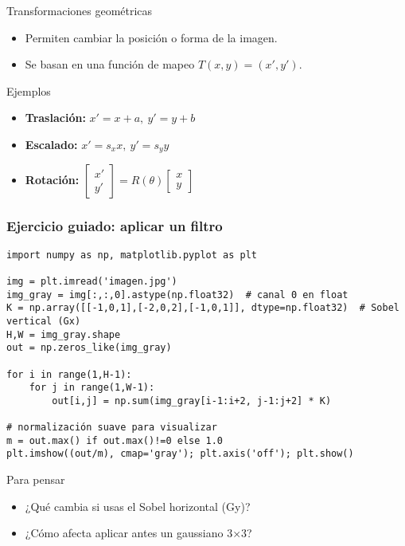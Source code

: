 \documentclass[10pt]{beamer}
\begin{document}
\begin{frame}{Transformaciones geom\'etricas}
\begin{itemize}
  \item Permiten cambiar la posici\'on o forma de la imagen.
  \item Se basan en una funci\'on de mapeo $T(x,y) = (x',y')$.
\end{itemize}
\vspace{3mm}
\begin{block}{Ejemplos}
\begin{itemize}
  \item \textbf{Traslaci\'on:} $x' = x + a,\ y' = y + b$
  \item \textbf{Escalado:} $x' = s_x x,\ y' = s_y y$
  \item \textbf{Rotaci\'on:} $\begin{bmatrix}x'\\y'\end{bmatrix} = R(\theta)\begin{bmatrix}x\\y\end{bmatrix}$
\end{itemize}
\end{block}
\centering
{}
\end{frame}

\begin{frame}[fragile]
  \frametitle{Ejercicio guiado: aplicar un filtro}
{\scriptsize
\begin{verbatim}
import numpy as np, matplotlib.pyplot as plt

img = plt.imread('imagen.jpg')
img_gray = img[:,:,0].astype(np.float32)  # canal 0 en float
K = np.array([[-1,0,1],[-2,0,2],[-1,0,1]], dtype=np.float32)  # Sobel vertical (Gx)
H,W = img_gray.shape
out = np.zeros_like(img_gray)

for i in range(1,H-1):
    for j in range(1,W-1):
        out[i,j] = np.sum(img_gray[i-1:i+2, j-1:j+2] * K)

# normalización suave para visualizar
m = out.max() if out.max()!=0 else 1.0
plt.imshow((out/m), cmap='gray'); plt.axis('off'); plt.show()
\end{verbatim}
}
\begin{block}{Para pensar}
\begin{itemize}
  \item ¿Qué cambia si usas el Sobel horizontal (Gy)?
  \item ¿Cómo afecta aplicar antes un gaussiano 3×3?
\end{itemize}
\end{block}
\end{frame}
\end{document}
